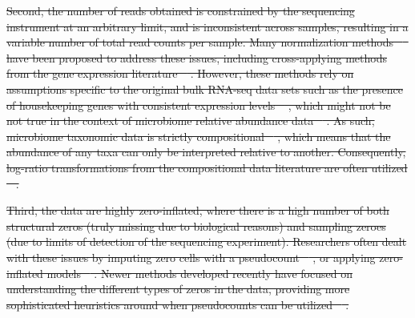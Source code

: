 \documentclass[10pt,letterpaper]{article}
\providecommand{\DIFdeltex}[1]{{\protect\color{red}\sout{#1}}}                      %
\providecommand{\DIFdel}[1]{\texorpdfstring{\DIFdeltex{#1}}{}} %
\begin{document}
\DIFdel{Second, the number of reads obtained is constrained by the sequencing instrument at an arbitrary limit, and is inconsistent across samples, resulting in a variable number of total read counts per sample. Many normalization methods \mbox{%
\cite{weiss2017} }\hspace{0pt}%
have been proposed to address these issues, including cross-applying methods from the gene expression literature \mbox{%
\cite{mcmurdie2014}}\hspace{0pt}%
. However, these methods rely on assumptions specific to the original bulk RNA-seq data sets such as the presence of housekeeping genes with consistent expression levels \mbox{%
\cite{love2014}}\hspace{0pt}%
, which might not be not true in the context of microbiome relative abundance data \mbox{%
\cite{quinn2019,quinn2018b}}\hspace{0pt}%
. As such, microbiome taxonomic data is strictly compositional \mbox{%
\cite{gloor2017}}\hspace{0pt}%
, which means that the abundance of any taxa can only be interpreted relative to another. Consequently, log-ratio transformations from the compositional data literature are often utilized \mbox{%
\cite{aitchison1999}}\hspace{0pt}%
. 
}%

\DIFdel{Third, the data are highly zero-inflated, where there is a high number of both structural zeros (truly missing due to biological reasons) and sampling zeroes (due to limits of detection of the sequencing experiment). Researchers often dealt with these issues by imputing zero cells with a pseudocount \mbox{%
\cite{kurtz2015}}\hspace{0pt}%
, or applying zero-inflated models \mbox{%
\cite{chen2018, kaul2017}}\hspace{0pt}%
. Newer methods developed recently have focused on understanding the different types of zeros in the data, providing more sophisticated heuristics around when pseudocounts can be utilized \mbox{%
\cite{kaul2017a}}\hspace{0pt}%
.   
}%
\end{document}
